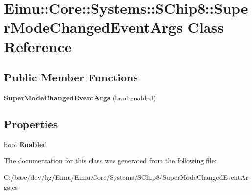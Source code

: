 \hypertarget{class_eimu_1_1_core_1_1_systems_1_1_s_chip8_1_1_super_mode_changed_event_args}{
\section{Eimu::Core::Systems::SChip8::SuperModeChangedEventArgs Class Reference}
\label{class_eimu_1_1_core_1_1_systems_1_1_s_chip8_1_1_super_mode_changed_event_args}
}
\subsection*{Public Member Functions}
\begin{DoxyCompactItemize}
\item 
\hypertarget{class_eimu_1_1_core_1_1_systems_1_1_s_chip8_1_1_super_mode_changed_event_args_a37334dc738470e1cf6b6b2b20bd76254}{
{\bfseries SuperModeChangedEventArgs} (bool enabled)}
\label{class_eimu_1_1_core_1_1_systems_1_1_s_chip8_1_1_super_mode_changed_event_args_a37334dc738470e1cf6b6b2b20bd76254}

\end{DoxyCompactItemize}
\subsection*{Properties}
\begin{DoxyCompactItemize}
\item 
\hypertarget{class_eimu_1_1_core_1_1_systems_1_1_s_chip8_1_1_super_mode_changed_event_args_afd1370ca13b53605f85212f71db75101}{
bool {\bfseries Enabled}}
\label{class_eimu_1_1_core_1_1_systems_1_1_s_chip8_1_1_super_mode_changed_event_args_afd1370ca13b53605f85212f71db75101}

\end{DoxyCompactItemize}


The documentation for this class was generated from the following file:\begin{DoxyCompactItemize}
\item 
C:/base/dev/hg/Eimu/Eimu.Core/Systems/SChip8/SuperModeChangedEventArgs.cs\end{DoxyCompactItemize}
